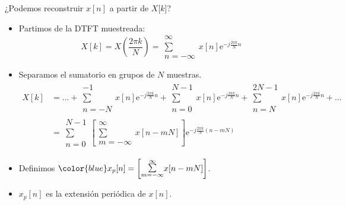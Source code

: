 \documentclass{beamer}
\numberwithin{section}{part}
\begin{document}
\begin{frame}
  \alert {¿Podemos reconstruir $x[n]$ a partir de $X[k$]?}
  \begin{itemize}
    \item Partimos de la DTFT muestreada: \vspace{-0.2cm} \[ X[k]=X(\frac{2\pi k}{N})=\substack{\infty\\\sum\\n=-\infty}x[n]\text{e}^{-j\frac{2\pi k}{N} n} \]
    \item Separamos el sumatorio en grupos de $N$ muestras.
    \[
      \begin{aligned}
        X[k]&= ... +
        \substack{-1\\\sum\\n=-N}x[n]\text{e}^{-j\frac{2\pi k}{N} n} +
        \substack{N-1\\\sum\\n=0}x[n]\text{e}^{-j\frac{2\pi k}{N} n} +
        \substack{2N-1\\\sum\\n=N}x[n]\text{e}^{-j\frac{2\pi k}{N} n} + ...
        \\
          &= \substack{N-1\\\sum\\n=0}\left[\substack{\infty\\\sum\\m=-\infty}x[n-m N]\right]\text{e}^{-j\frac{2\pi k}{N} (n - mN)}
      \end{aligned}
    \]
    \item Definimos $\color{blue}x_p[n]=\left[\substack{\infty\\\sum\\m=-\infty}x[n-m N]\right]$.
    \item $x_p[n]$ es la extensión periódica de $x[n]$.
  \end{itemize}
\end{frame}
\end{document}
